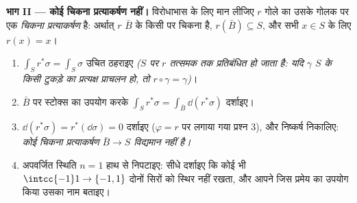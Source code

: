 \begin{problem}[{सप्ताहांत समस्या --- कोई प्रत्याकर्षण नहीं, कोई
पलायन नहीं}]
\medskip
\noindent\textbf{भाग II --- कोई चिकना प्रत्याकर्षण नहीं।}
विरोधाभास के लिए मान लीजिए $r$ गोले का उसके गोलक पर एक
\emph{चिकना प्रत्याकर्षण} है: अर्थात् $r$ $\bar B$ के किसी 
पर चिकना है, $r(\bar B) \subseteq S$, और सभी $x \in S$ के लिए $r(x) = x$।
\begin{enumerate}[resume]
  \item $\int_Sr^*\sigma = \int_S\sigma$ उचित ठहराइए \emph{($S$ पर $r$ तत्समक तक
        प्रतिबंधित हो जाता है: यदि $\gamma$ $S$ के किसी टुकड़े का
        प्रत्यक्ष प्राचलन हो, तो $r\circ\gamma = \gamma$)}।
  \item $\bar B$ पर स्टोक्स का उपयोग करके $\int_Sr^*\sigma =
        \int_{\bar B}\dd(r^*\sigma)$ दर्शाइए।
  \item $\dd(r^*\sigma) = r^*(\dd\sigma) = 0$ दर्शाइए ($\varphi = r$ पर लगाया गया प्रश्न 3), और निष्कर्ष
        निकालिए: \emph{कोई चिकना प्रत्याकर्षण $\bar B \to S$ विद्यमान नहीं
        है।}
  \item अपवर्जित स्थिति $n = 1$ हाथ से निपटाइए: सीधे दर्शाइए कि कोई
        भी  $\intcc{-1}1 \to
        \{-1, 1\}$ दोनों सिरों को स्थिर नहीं रखता,
        और आपने जिस प्रमेय का उपयोग किया उसका नाम बताइए।
\end{enumerate}


\end{problem}
